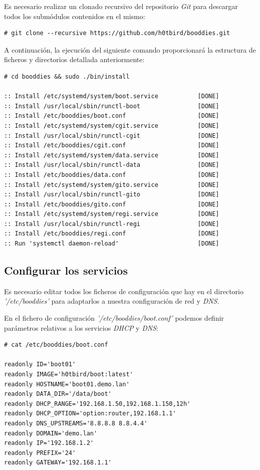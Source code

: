 \documentclass[a4paper,12pt,spanish,final]{epsc_tfc_pfc}
\begin{document}
Es necesario realizar un clonado recursivo del repositorio \emph{Git} para descargar todos los submódulos contenidos en el mismo:\\

\begin{lstlisting}[style=dnsmasq]
# git clone --recursive https://github.com/h0tbird/booddies.git
\end{lstlisting}

A continuación, la ejecución del siguiente comando proporcionará la estructura de ficheros y directorios detallada anteriormente:\\

\begin{lstlisting}[style=dnsmasq]
# cd booddies && sudo ./bin/install

:: Install /etc/systemd/system/boot.service           [DONE]
:: Install /usr/local/sbin/runctl-boot                [DONE]
:: Install /etc/booddies/boot.conf                    [DONE]
:: Install /etc/systemd/system/cgit.service           [DONE]
:: Install /usr/local/sbin/runctl-cgit                [DONE]
:: Install /etc/booddies/cgit.conf                    [DONE]
:: Install /etc/systemd/system/data.service           [DONE]
:: Install /usr/local/sbin/runctl-data                [DONE]
:: Install /etc/booddies/data.conf                    [DONE]
:: Install /etc/systemd/system/gito.service           [DONE]
:: Install /usr/local/sbin/runctl-gito                [DONE]
:: Install /etc/booddies/gito.conf                    [DONE]
:: Install /etc/systemd/system/regi.service           [DONE]
:: Install /usr/local/sbin/runctl-regi                [DONE]
:: Install /etc/booddies/regi.conf                    [DONE]
:: Run 'systemctl daemon-reload'                      [DONE]
\end{lstlisting}

\subsection{Configurar los servicios}

Es necesario editar todos los ficheros de configuración que hay en el directorio \emph{'/etc/booddies'} para adaptarlos a nuestra configuración de red y \emph{DNS}.

En el fichero de configuración \emph{'/etc/booddies/boot.conf'} podemos definir parámetros relativos a los servicios \emph{DHCP} y \emph{DNS}:\\

\begin{lstlisting}[style=dnsmasq]
# cat /etc/booddies/boot.conf

readonly ID='boot01'
readonly IMAGE='h0tbird/boot:latest'
readonly HOSTNAME='boot01.demo.lan'
readonly DATA_DIR='/data/boot'
readonly DHCP_RANGE='192.168.1.50,192.168.1.150,12h'
readonly DHCP_OPTION='option:router,192.168.1.1'
readonly DNS_UPSTREAMS='8.8.8.8 8.8.4.4'
readonly DOMAIN='demo.lan'
readonly IP='192.168.1.2'
readonly PREFIX='24'
readonly GATEWAY='192.168.1.1'
\end{lstlisting}
\end{document}
